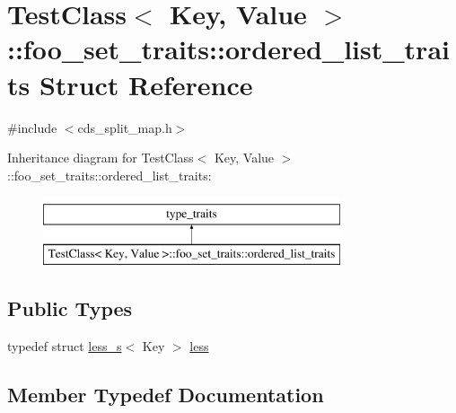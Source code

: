\hypertarget{struct_test_class_1_1foo__set__traits_1_1ordered__list__traits}{}\section{Test\+Class$<$ Key, Value $>$\+:\+:foo\+\_\+set\+\_\+traits\+:\+:ordered\+\_\+list\+\_\+traits Struct Reference}
\label{struct_test_class_1_1foo__set__traits_1_1ordered__list__traits}


{\ttfamily \#include $<$cds\+\_\+split\+\_\+map.\+h$>$}

Inheritance diagram for Test\+Class$<$ Key, Value $>$\+:\+:foo\+\_\+set\+\_\+traits\+:\+:ordered\+\_\+list\+\_\+traits\+:\begin{figure}[H]
\begin{center}
\leavevmode
\includegraphics[height=2.000000cm]{struct_test_class_1_1foo__set__traits_1_1ordered__list__traits}
\end{center}
\end{figure}
\subsection*{Public Types}
\begin{DoxyCompactItemize}
\item 
typedef struct \hyperlink{struct_test_class_1_1less__s}{less\+\_\+s}$<$ Key $>$ \hyperlink{struct_test_class_1_1foo__set__traits_1_1ordered__list__traits_ac8741038df1d94768fbc5f5411320a1a}{less}
\end{DoxyCompactItemize}


\subsection{Member Typedef Documentation}
\hypertarget{struct_test_class_1_1foo__set__traits_1_1ordered__list__traits_ac8741038df1d94768fbc5f5411320a1a}{}
